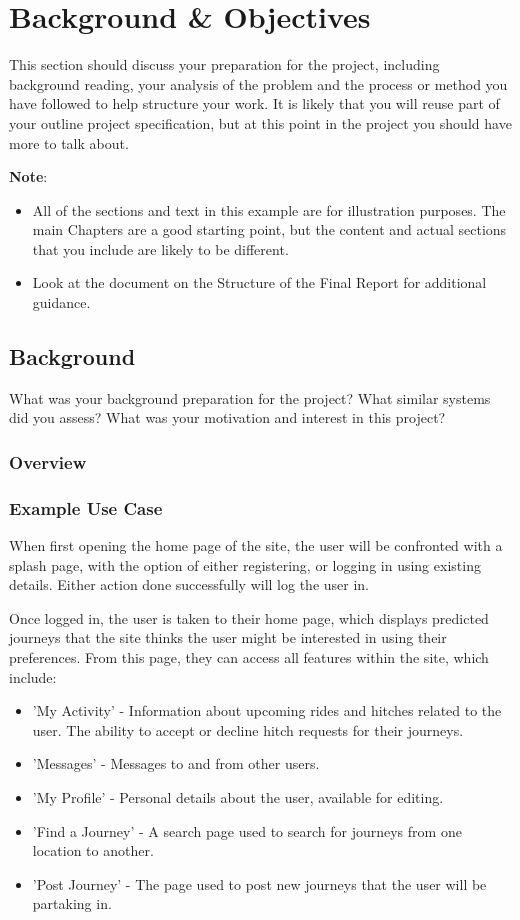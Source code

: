 \chapter{Background \& Objectives}

This section should discuss your preparation for the project, including background reading, your analysis of the problem and the process or method you have followed to help structure your work.  It is likely that you will reuse part of your outline project specification, but at this point in the project you should have more to talk about. 

\textbf{Note}: 

\begin{itemize}
   \item All of the sections and text in this example are for illustration purposes. The main Chapters are a good starting point, but the content and actual sections that you include are likely to be different.
   
   \item Look at the document on the Structure of the Final Report for additional guidance. 
   
\end {itemize}

\section{Background}
What was your background preparation for the project? What similar systems did you assess? What was your motivation and interest in this project? 
\subsection{Overview}
\subsection{Example Use Case}
	When first opening the home page of the site, the user will be confronted with a splash page, with the option of either registering, or logging in using existing details. Either action done successfully will log the user in.
	
	Once logged in, the user is taken to their home page, which displays predicted journeys that the site thinks the user might be interested in using their preferences. From this page, they can access all features within the site, which include:
	\begin{itemize}
		\item 'My Activity' - Information about upcoming rides and hitches related to the user. The ability to accept or decline hitch requests for their journeys.
		\item 'Messages' - Messages to and from other users.
		\item 'My Profile' - Personal details about the user, available for editing.
		\item 'Find a Journey' - A search page used to search for journeys from one location to another.
		\item 'Post Journey' - The page used to post new journeys that the user will be partaking in.		
	\end{itemize}
	

